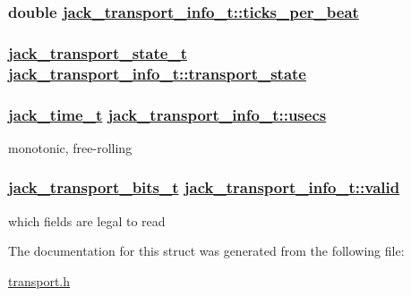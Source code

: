 \hypertarget{structjack__transport__info__t_fd4513bf48d81882ed9af87dd400a9db}{
\subsubsection[ticks\_\-per\_\-beat]{\setlength{\rightskip}{0pt plus 5cm}double \hyperlink{structjack__transport__info__t_fd4513bf48d81882ed9af87dd400a9db}{jack\_\-transport\_\-info\_\-t::ticks\_\-per\_\-beat}}}
\label{structjack__transport__info__t_fd4513bf48d81882ed9af87dd400a9db}


\hypertarget{structjack__transport__info__t_40308c8c7d6b7c0a4f8ecfcfd35e3875}{
\subsubsection[transport\_\-state]{\setlength{\rightskip}{0pt plus 5cm}\hyperlink{transport_8h_499ffea77b03cce9c647d7b5065f7338}{jack\_\-transport\_\-state\_\-t} \hyperlink{structjack__transport__info__t_40308c8c7d6b7c0a4f8ecfcfd35e3875}{jack\_\-transport\_\-info\_\-t::transport\_\-state}}}
\label{structjack__transport__info__t_40308c8c7d6b7c0a4f8ecfcfd35e3875}


\hypertarget{structjack__transport__info__t_edb03a0d7fde02d2a6f0470bdce6e92a}{
\subsubsection[usecs]{\setlength{\rightskip}{0pt plus 5cm}\hyperlink{types_8h_71d1a1356a36ae1f9e60b4361e21905e}{jack\_\-time\_\-t} \hyperlink{structjack__transport__info__t_edb03a0d7fde02d2a6f0470bdce6e92a}{jack\_\-transport\_\-info\_\-t::usecs}}}
\label{structjack__transport__info__t_edb03a0d7fde02d2a6f0470bdce6e92a}


monotonic, free-rolling \hypertarget{structjack__transport__info__t_9f7d0ee82b6a6ca7ddeae841f3253059}{
\subsubsection[valid]{\setlength{\rightskip}{0pt plus 5cm}\hyperlink{transport_8h_25433447d7aa9851e5af2c1b55f8da63}{jack\_\-transport\_\-bits\_\-t} \hyperlink{structjack__transport__info__t_9f7d0ee82b6a6ca7ddeae841f3253059}{jack\_\-transport\_\-info\_\-t::valid}}}
\label{structjack__transport__info__t_9f7d0ee82b6a6ca7ddeae841f3253059}


which fields are legal to read 

The documentation for this struct was generated from the following file:\begin{CompactItemize}
\item 
\hyperlink{transport_8h}{transport.h}\end{CompactItemize}
